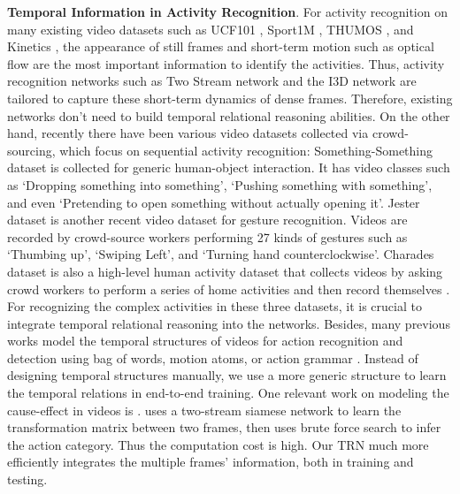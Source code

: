 \documentclass[runningheads]{llncs}
\begin{document}
\textbf{Temporal Information in Activity Recognition}. For activity recognition on many existing video datasets such as UCF101 \cite{soomro2012ucf101}, Sport1M \cite{karpathy2014large}, THUMOS \cite{gorban2015thumos}, and Kinetics \cite{kay2017kinetics}, the appearance of still frames and short-term motion such as optical flow are the most important information to identify the activities. Thus, activity recognition networks such as Two Stream network \cite{simonyan2014two} and the I3D network \cite{carreira2017quo} are tailored to capture these short-term dynamics of dense frames. Therefore, existing networks don't need to build temporal relational reasoning abilities. On the other hand, recently there have been various video datasets collected via crowd-sourcing, which focus on sequential activity recognition: Something-Something dataset \cite{goyal2017something} is collected for generic human-object interaction. It has video classes such as `Dropping something into something', `Pushing something with something', and even `Pretending to open something without actually opening it'. Jester dataset \cite{jester} is another recent video dataset for gesture recognition. Videos are recorded by crowd-source workers performing 27 kinds of gestures such as `Thumbing up', `Swiping Left', and `Turning hand counterclockwise'. Charades dataset is also a high-level human activity dataset that collects videos by asking crowd workers to perform a series of home activities and then record themselves \cite{sigurdsson2016hollywood}. For recognizing the complex activities in these three datasets, it is crucial to integrate temporal relational reasoning into the networks. Besides, many previous works model the temporal structures of videos for action recognition and detection using bag of words, motion atoms, or action grammar \cite{gaidon2013temporal,pirsiavash2014parsing,wang2013action,gaidon2014activity,wang2016mofap}. Instead of designing temporal structures manually, we use a more generic structure to learn the temporal relations in end-to-end training. One relevant work on modeling the cause-effect in videos is \cite{wang2016actions}. \cite{wang2016actions} uses a two-stream siamese network to learn the transformation matrix between two frames, then uses brute force search to infer the action category. Thus the computation cost is high. Our TRN much more efficiently integrates the multiple frames’ information, both in training and testing.
\end{document}
